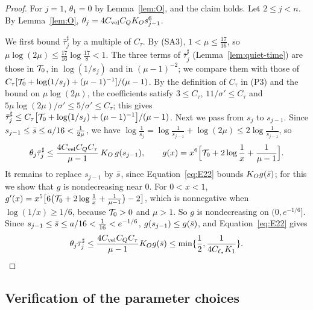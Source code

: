 \begin{proof}
For $j=1$, $\theta_1=0$ by Lemma~\ref{lem:O}, and the claim holds. Let
$2\le j<n$. By Lemma~\ref{lem:O}, $\theta_j=4C_{\mathrm{vel}} C_QK_{O} s_{j-1}^6$.

We first bound $\bar\tau^\sharp_j$ by a multiple of $C_\tau$. By (SA3),
$1<\mu\le\frac{17}{16}$, so $\mu\log(2\mu)\le\frac{17}{16}\log\frac{17}8<1$.
The three terms of $\bar\tau^\sharp_j$ (Lemma~\ref{lem:quiet-time}) are those in
$\mathcal{T}_0$, in $\log(1/s_j)$ and in $(\mu-1)^{-2}$; we compare them with
those of $C_\tau[\mathcal{T}_0+\log(1/s_j)+(\mu-1)^{-1}]/(\mu-1)$. By the definition of
$C_\tau$ in \textup{(P3)} and the bound on $\mu\log(2\mu)$, the coefficients
satisfy $3\le C_\tau$,
$11/\sigma'\le C_\tau$ and $5\mu\log(2\mu)/\sigma'\le5/\sigma'\le C_\tau$;
this gives $\bar\tau^\sharp_j\le C_\tau\big[\mathcal{T}_0+\log(1/s_j)+(\mu-1)^{-1}\big]/(\mu-1)$.
Next we pass from $s_j$ to $s_{j-1}$. Since
$s_{j-1}\le\bar s\le a/16<\frac1{2\mu}$, we have
$\log\frac1{s_j}=\log\frac1{s_{j-1}}+\log(2\mu)\le2\log\frac1{s_{j-1}}$, so
\[
\theta_j\bar\tau^\sharp_j\le\frac{4C_{\mathrm{vel}} C_QC_\tau}{\mu-1}\,K_{O}\,g(s_{j-1}),\qquad
g(x)=x^6\Big[\mathcal{T}_0+2\log\frac1x+\frac1{\mu-1}\Big].
\]
It remains to replace $s_{j-1}$ by $\bar s$, since Equation~\eqref{eq:E22}
bounds $K_{O} g(\bar s)$; for this we show that $g$ is nondecreasing near $0$. For $0<x<1$,
$g'(x)=x^5\big[6\big(\mathcal{T}_0+2\log\frac1x+\frac1{\mu-1}\big)-2\big]$, which is
nonnegative when $\log(1/x)\ge1/6$, because $\mathcal{T}_0>0$ and $\mu>1$. So $g$ is
nondecreasing on $(0,e^{-1/6}]$. Since $s_{j-1}\le\bar s\le a/16<\frac1{16}<e^{-1/6}$,
$g(s_{j-1})\le g(\bar s)$, and Equation~\eqref{eq:E22} gives
\[
\theta_j\bar\tau^\sharp_j\le\frac{4C_{\mathrm{vel}} C_QC_\tau}{\mu-1}K_{O} g(\bar s)\le\min\{\frac12,\frac1{4C_{\ell_*} K_1}\}.\qedhere
\]
\end{proof}

\subsection{Verification of the parameter choices}
\label{sec:param-verification}

